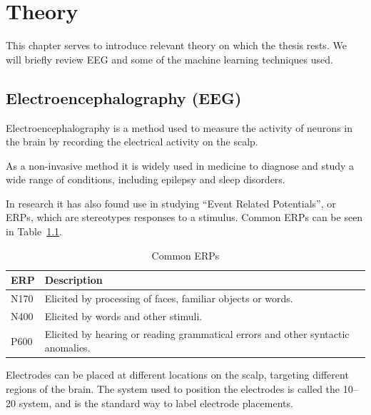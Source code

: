 \chapter{Theory}

This chapter serves to introduce relevant theory on which the thesis rests. We will briefly review EEG and some of the machine learning techniques used.

\section{Electroencephalography (EEG)}\label{eeg-theory}

    Electroencephalography is a method used to measure the activity of neurons in the brain by recording the electrical activity on the scalp.

    As a non-invasive method it is widely used in medicine to diagnose and study a wide range of conditions, including epilepsy and sleep disorders.

    In research it has also found use in studying ``Event Related Potentials'', or ERPs, which are stereotypes responses to a stimulus. Common ERPs can be seen in Table~\ref{table:erps}.

    \begin{table}
        \begin{tabular}{ll}
            \toprule
            ERP & Description
            \\
            \midrule
            N170 & Elicited by processing of faces, familiar objects or words.
            \\
            N400 & Elicited by words and other stimuli.
            \\
            P600 & Elicited by hearing or reading grammatical errors and other syntactic anomalies.
            \\
            \bottomrule
        \end{tabular}
        \caption{Common ERPs}\label{table:erps}
    \end{table}

    Electrodes can be placed at different locations on the scalp, targeting different regions of the brain. The system used to position the electrodes is called the 10–20 system, and is the standard way to label electrode placements.

